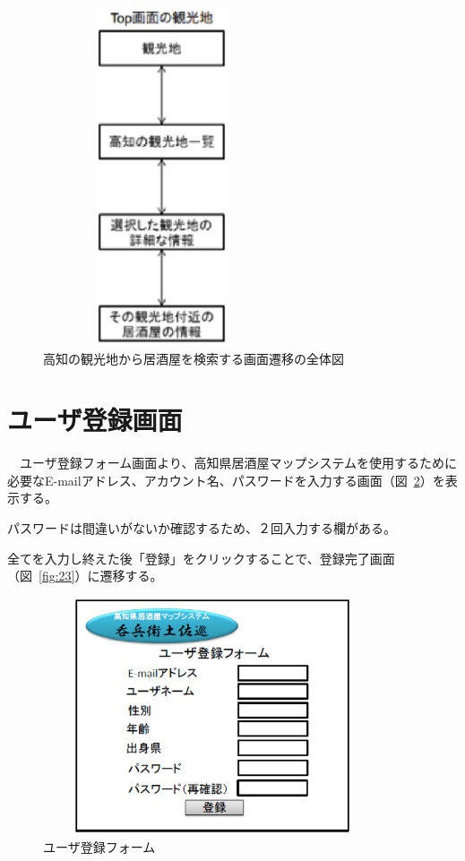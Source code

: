 \documentclass[a4j,titlepage]{jarticle}
\begin{document}
\begin {figure}[!htbp]
    \begin{center}
    \includegraphics [height=10cm, width=7cm]{21.eps}
    \caption {高知の観光地から居酒屋を検索する画面遷移の全体図}
    \label {fig:21}
    \end{center}
\end {figure}

\clearpage

\section{ユーザ登録画面}
　ユーザ登録フォーム画面より、高知県居酒屋マップシステムを使用するために必要なE-mailアドレス、アカウント名、パスワードを入力する画面（図~\ref{fig:22}）を表示する。



パスワードは間違いがないか確認するため、２回入力する欄がある。



全てを入力し終えた後「登録」をクリックすることで、登録完了画面（図~\ref{fig:23}）に遷移する。




\begin {figure}[!htbp]
    \begin{center}
    \includegraphics [height=7cm, width=10cm]{22.eps}
    \caption {ユーザ登録フォーム}
    \label {fig:22}
    \end{center}
\end {figure}
\end{document}
